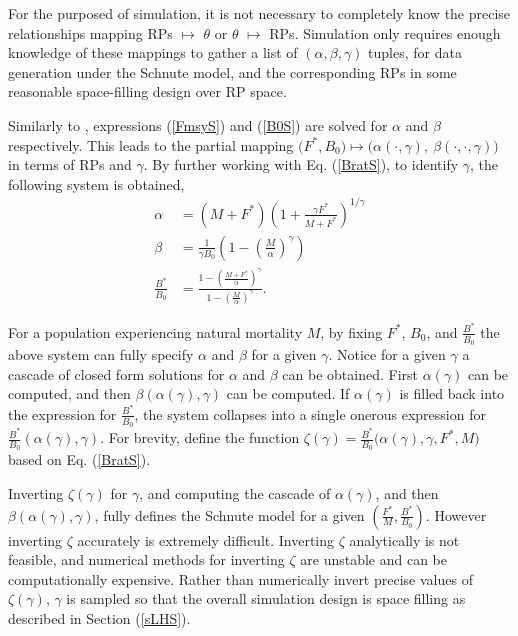 \documentclass[12pt]{article}
\begin{document}
%
For the purposed of simulation, it is not necessary to completely know 
the precise relationships mapping RPs $\mapsto$ $\theta$ or $\theta$ $\mapsto$ 
RPs. Simulation only requires enough knowledge of these mappings to gather a list 
of $(\alpha, \beta, \gamma)$ tuples, for data generation under the Schnute model, 
and the corresponding RPs in some reasonable space-filling design over RP space. 

%
Similarly to , expressions %
(\ref{FmsyS}) and (\ref{B0S}) are solved for $\alpha$ and $\beta$ respectively. 
This leads to the partial mapping 
$\big(F^*, B_0\big) \mapsto \big(\alpha(\cdot, \gamma), ~\beta(\cdot, \cdot, \gamma)\big)$ 
in terms of RPs and $\gamma$. 
By further working with Eq. (\ref{BratS}), to identify $\gamma$, the following 
system is obtained,
%
\begin{align}
\alpha &= (M+F^*)\left(1+\frac{\gamma F^*}{M+F^*}\right)^{1/\gamma} \nonumber\\
\beta &= \frac{1}{\gamma B_0}\left(1-\left(\frac{M}{\alpha}\right)^\gamma\right) \label{abgSys}\\
\frac{B^*}{B_0} &= \frac{1-\left(\frac{M+F^*}{\alpha}\right)^\gamma}{ 1-\left(\frac{M}{\alpha}\right)^\gamma } \nonumber.
\end{align}

%
For a population experiencing natural mortality $M$, by fixing $F^*$, 
$B_0$, and $\frac{B^*}{B_0}$ %
the above system can fully specify $\alpha$ and $\beta$ for a given $\gamma$. %
Notice for a given $\gamma$ a cascade of closed form solutions for $\alpha$ 
and $\beta$ can be obtained. First $\alpha(\gamma)$ can be computed, and then 
$\beta(\alpha(\gamma), \gamma)$ can be computed. If $\alpha(\gamma)$ is filled 
back into the expression for $\frac{B^*}{B_0}$, the system collapses into 
a single onerous expression for $\frac{B^*}{B_0}(\alpha(\gamma), \gamma)$. 
For brevity, define the function \mbox{$\zeta(\gamma)=\frac{B^*}{B_0}\big(\alpha(\gamma), \gamma, F^*, M\big)$} based on Eq. (\ref{BratS}). 

Inverting $\zeta(\gamma)$ for $\gamma$, and computing the cascade of 
$\alpha(\gamma)$, and then $\beta(\alpha(\gamma), \gamma)$, fully defines the 
Schnute model for a given $(\frac{F^*}{M}, \frac{B^*}{B_0})$. However
inverting $\zeta$ accurately is extremely difficult. Inverting $\zeta$ 
analytically is not feasible, and numerical methods for inverting 
$\zeta$ are unstable and can be computationally expensive. 
%
Rather than numerically invert precise values of $\zeta(\gamma)$, $\gamma$ is 
sampled so that the overall simulation design is space filling as described in 
Section (\ref{sLHS}).
\end{document}
